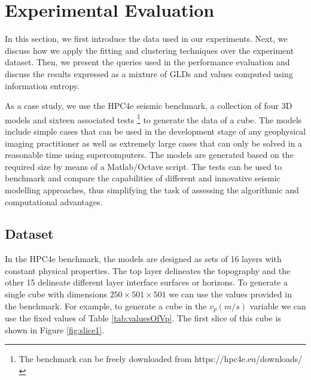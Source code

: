 \documentclass[11pt]{article}
\begin{document}
\section{Experimental Evaluation}
\label{Experiments}
In this section, we first introduce the data used in our experiments. Next, we discuss how we apply the fitting and clustering techniques over the experiment dataset. Then, we present the queries used in the performance evaluation and discuss the results expressed as a mixture of GLDs and values computed using information entropy.

As a case study, we use the HPC4e seismic benchmark, a collection of four 3D models and sixteen associated tests  \footnote{The benchmark can be freely downloaded from https://hpc4e.eu/downloads/} to generate the data of a cube. The models include simple cases that can be used in the development stage of any geophysical imaging practitioner as well as extremely large cases that can only be solved in a reasonable time using supercomputers. The models are generated based on the required size by means of a Matlab/Octave script. The tests can be used to benchmark and compare the capabilities of different and innovative seismic modelling approaches, thus simplifying the task of assessing the algorithmic and computational advantages.



\subsection{Dataset}
In the HPC4e benchmark, the models are designed as sets of 16 layers with constant physical properties. The top layer delineates the topography and the other 15 delineate different layer interface surfaces or horizons. To generate a single cube with dimensions $250\times501\times501$ we can use the values provided in the benchmark. For example, to generate a cube in the $v_{p}(m/s)$ variable we can use the fixed values of Table \ref{tab:valuesOfVp}. The first slice of this cube is shown in Figure \ref{fig:slice1}.
\end{document}
